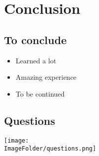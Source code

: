 %
%

\section{Conclusion}

\subsection{To conclude}
\begin{FrameWithSubSection}
    \begin{itemize}
        \item Learned a lot
        \item Amazing experience
        \item To be continued
    \end{itemize}
\end{FrameWithSubSection}

\subsection{Questions}
\begin{FrameWithSubSection}
    \center
  \texttt{[image: \\ImageFolder/questions.png]}
\end{FrameWithSubSection}
